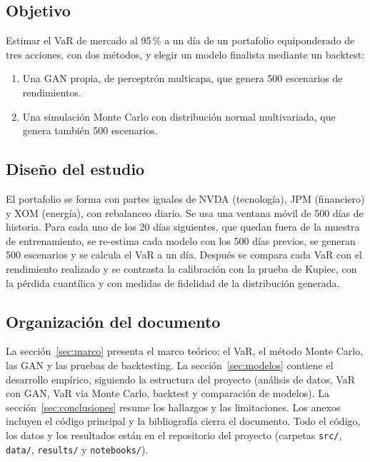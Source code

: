 \documentclass[12pt,letterpaper]{article}
\begin{document}
\subsection*{Objetivo}

Estimar el VaR de mercado al 95\,\% a un día de un portafolio equiponderado de tres acciones, con dos métodos, y elegir un modelo finalista mediante un backtest:

\begin{enumerate}[label=\arabic*., nosep]
  \item Una GAN propia, de perceptrón multicapa, que genera 500 escenarios de rendimientos.
  \item Una simulación Monte Carlo con distribución normal multivariada, que genera también 500 escenarios.
\end{enumerate}

\subsection*{Diseño del estudio}

El portafolio se forma con partes iguales de NVDA (tecnología), JPM (financiero) y XOM (energía), con rebalanceo diario. Se usa una ventana móvil de 500 días de historia. Para cada uno de los 20 días siguientes, que quedan fuera de la muestra de entrenamiento, se re-estima cada modelo con los 500 días previos, se generan 500 escenarios y se calcula el VaR a un día. Después se compara cada VaR con el rendimiento realizado y se contrasta la calibración con la prueba de Kupiec, con la pérdida cuantílica y con medidas de fidelidad de la distribución generada.

\subsection*{Organización del documento}

La sección~\ref{sec:marco} presenta el marco teórico: el VaR, el método Monte Carlo, las GAN y las pruebas de backtesting. La sección~\ref{sec:modelos} contiene el desarrollo empírico, siguiendo la estructura del proyecto (análisis de datos, VaR con GAN, VaR vía Monte Carlo, backtest y comparación de modelos). La sección~\ref{sec:conclusiones} resume los hallazgos y las limitaciones. Los anexos incluyen el código principal y la bibliografía cierra el documento. Todo el código, los datos y los resultados están en el repositorio del proyecto (carpetas \texttt{src/}, \texttt{data/}, \texttt{results/} y \texttt{notebooks/}).
\end{document}
